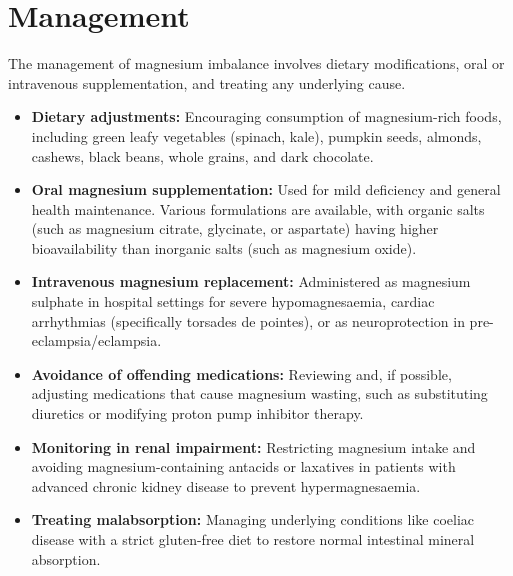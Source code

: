 \section*{Management}
The management of magnesium imbalance involves dietary modifications, oral or intravenous supplementation, and treating any underlying cause.
\begin{itemize}
    \item \textbf{Dietary adjustments:} Encouraging consumption of magnesium-rich foods, including green leafy vegetables (spinach, kale), pumpkin seeds, almonds, cashews, black beans, whole grains, and dark chocolate.
    \item \textbf{Oral magnesium supplementation:} Used for mild deficiency and general health maintenance. Various formulations are available, with organic salts (such as magnesium citrate, glycinate, or aspartate) having higher bioavailability than inorganic salts (such as magnesium oxide).
    \item \textbf{Intravenous magnesium replacement:} Administered as magnesium sulphate in hospital settings for severe hypomagnesaemia, cardiac arrhythmias (specifically torsades de pointes), or as neuroprotection in pre-eclampsia/eclampsia.
    \item \textbf{Avoidance of offending medications:} Reviewing and, if possible, adjusting medications that cause magnesium wasting, such as substituting diuretics or modifying proton pump inhibitor therapy.
    \item \textbf{Monitoring in renal impairment:} Restricting magnesium intake and avoiding magnesium-containing antacids or laxatives in patients with advanced chronic kidney disease to prevent hypermagnesaemia.
    \item \textbf{Treating malabsorption:} Managing underlying conditions like coeliac disease with a strict gluten-free diet to restore normal intestinal mineral absorption.
\end{itemize}

